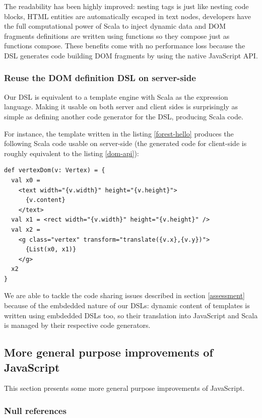 \documentclass[american,english,runningheads]{llncs}
\begin{document}
The readability has been highly improved: nesting tags is just like nesting code blocks, HTML entities are
automatically escaped in text nodes, developers have the full computational power of Scala to inject dynamic data and
DOM fragments definitions are written using functions so they compose just as functions compose. These benefits come
with no performance loss because the DSL generates code building DOM fragments by using the native JavaScript API.

\subsubsection{Reuse the DOM definition DSL on server-side}

Our DSL is equivalent to a template engine with Scala as the expression language. Making it usable on both server and
client sides is surprisingly as simple as defining another code generator for the DSL, producing Scala code.

For instance, the template written in the listing \ref{forest-hello} produces the following Scala code usable on
server-side (the generated code for client-side is roughly equivalent to the listing \ref{dom-api}):

\begin{lstlisting}
def vertexDom(v: Vertex) = {
  val x0 =
    <text width="{v.width}" height="{v.height}">
      {v.content}
    </text>
  val x1 = <rect width="{v.width}" height="{v.height}" />
  val x2 =
    <g class="vertex" transform="translate({v.x},{v.y})">
      {List(x0, x1)}
    </g>
  x2
}
\end{lstlisting}

We are able to tackle the code sharing issues described in section \ref{assessment} because of the embdedded nature
of our DSLs: dynamic content of templates is written using embdedded DSLs too, so their translation into JavaScript
and Scala is managed by their respective code generators.

\subsection{More general purpose improvements of JavaScript}

This section presents some more general purpose improvements of JavaScript.

\subsubsection{Null references}
\end{document}
